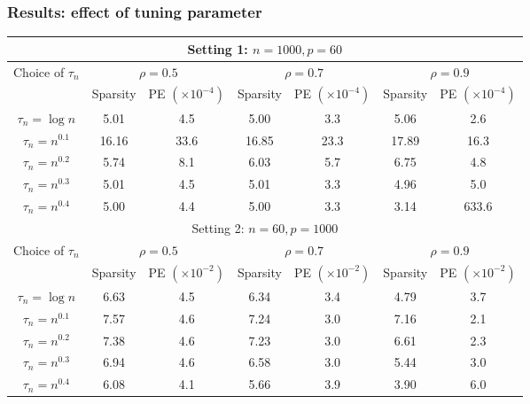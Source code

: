 \documentclass[10pt]{beamer}
\theoremstyle{definition}
\begin{document}
\begin{frame}
\frametitle{Results: effect of tuning parameter}
\begin{table}
\centering
\begin{scriptsize}
\begin{tabular}{c|cc|cc|cc}
    \hline
    \multicolumn{7}{c}{Setting 1: $n = 1000, p = 60$}\\\hline
    Choice of $\tau_n$ & \multicolumn{2}{|c}{$\rho = 0.5$} & \multicolumn{2}{|c}{$\rho = 0.7$} & \multicolumn{2}{|c}{$\rho = 0.9$}\\\cline{2-7}
    & Sparsity  & PE $(\times 10^{-4})$ & Sparsity  & PE $(\times 10^{-4})$ & Sparsity  & PE $(\times 10^{-4})$  \\ \hline
    $\tau_n = \log n$       & 5.01  & 4.5   & 5.00  & 3.3   & 5.06  & 2.6    \\
    $\tau_n = n^{0.1}$           & 16.16 & 33.6  & 16.85 & 23.3  & 17.89 & 16.3   \\
    $\tau_n = n^{0.2}$           & 5.74  & 8.1   & 6.03  & 5.7   & 6.75  & 4.8   \\
    $\tau_n = n^{0.3}$           & 5.01  & 4.5   & 5.01  & 3.3   & 4.96  & 5.0   \\
    $\tau_n = n^{0.4}$           & 5.00  & 4.4   & 5.00  & 3.3   & 3.14  & 633.6 \\\hline
    \multicolumn{7}{c}{Setting 2: $n = 60, p = 1000$}\\\hline
    Choice of $\tau_n$ & \multicolumn{2}{|c}{$\rho = 0.5$} & \multicolumn{2}{|c}{$\rho = 0.7$} & \multicolumn{2}{|c}{$\rho = 0.9$}\\\cline{2-7}
    & Sparsity  & PE $(\times 10^{-2})$ & Sparsity  & PE $(\times 10^{-2})$ & Sparsity  & PE $(\times 10^{-2})$  \\ \hline
    $\tau_n = \log n$       	 & 6.63  & 4.5   & 6.34 & 3.4   & 4.79  & 3.7 \\
    $\tau_n = n^{0.1}$      	 & 7.57  & 4.6   & 7.24 & 3.0   & 7.16  & 2.1  \\
    $\tau_n = n^{0.2}$           & 7.38  & 4.6   & 7.23 & 3.0   & 6.61  & 2.3   \\
    $\tau_n = n^{0.3}$           & 6.94  & 4.6   & 6.58 & 3.0   & 5.44  & 3.0   \\
    $\tau_n = n^{0.4}$           & 6.08  & 4.1   & 5.66 & 3.9   & 3.90  & 6.0 \\\hline

\end{tabular}
\end{scriptsize}
\end{table}
\end{frame}
\end{document}
